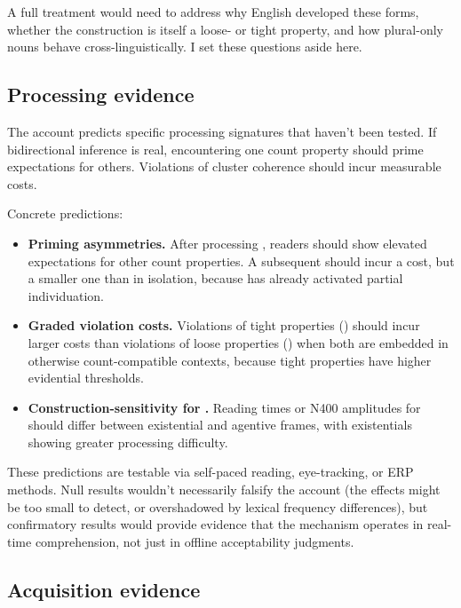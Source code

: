 \documentclass[12pt,a4paper]{article}
\begin{document}
A full treatment would need to address why English developed these forms, whether the  construction is itself a loose- or tight property, and how plural-only nouns behave cross-linguistically. I set these questions aside here.

\subsection{Processing evidence}

The account predicts specific processing signatures that haven't been tested. If bidirectional inference is real, encountering one count property should prime expectations for others. Violations of cluster coherence should incur measurable costs.

Concrete predictions:

\begin{itemize}
\item \textbf{Priming asymmetries.} After processing , readers should show elevated expectations for other count properties. A subsequent  should incur a cost, but a smaller one than  in isolation, because  has already activated partial individuation.
\item \textbf{Graded violation costs.} Violations of tight properties () should incur larger costs than violations of loose properties () when both are embedded in otherwise count-compatible contexts, because tight properties have higher evidential thresholds.
\item \textbf{Construction-sensitivity for .} Reading times or N400 amplitudes for  should differ between existential and agentive frames, with existentials showing greater processing difficulty.
\end{itemize}

These predictions are testable via self-paced reading, eye-tracking, or ERP methods. Null results wouldn't necessarily falsify the account (the effects might be too small to detect, or overshadowed by lexical frequency differences), but confirmatory results would provide evidence that the mechanism operates in real-time comprehension, not just in offline acceptability judgments.

\subsection{Acquisition evidence}
\end{document}
